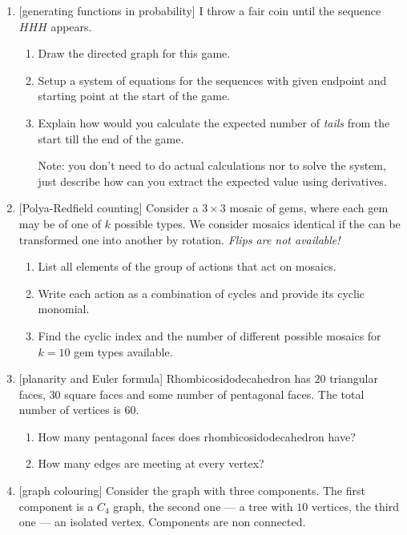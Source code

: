 \documentclass[12pt]{article}
\begin{document}
\begin{enumerate}
    
    \item {[generating functions in probability]} 
    I throw a fair coin until the sequence $HHH$ appears. %
\begin{enumerate}[label=\alph*)]
    \item Draw the directed graph for this game.
    \item Setup a system of equations for the sequences with given endpoint and starting point at the start of the game. 
    \item Explain how would you calculate the  expected number of \emph{tails} from the start till the end of the game.
    
    Note: you don't need to do actual calculations nor to solve the system, just describe how can you extract the expected value using derivatives. 
\end{enumerate}

    \item {[Polya-Redfield counting]}  Consider a $3\times 3$ mosaic of gems, where each gem may be of one of $k$ possible types.
    We consider mosaics identical if the can be transformed one into another by rotation. \emph{Flips are not available!} 
\begin{enumerate}[label=\alph*)]
    \item List all elements of the group of actions that act on mosaics.
    \item Write each action as a combination of cycles and provide its cyclic monomial. 
    \item Find the cyclic index and the number of different possible mosaics for $k=10$ gem types available.
\end{enumerate}
    \item {[planarity and Euler formula]} Rhombicosidodecahedron has $20$ triangular faces, $30$ square faces and some number of pentagonal faces. 
    The total number of vertices is $60$. 

    \begin{enumerate}[label=\alph*)]
        \item How many pentagonal faces does rhombicosidodecahedron have?
        \item How many edges are meeting at every vertex?
    \end{enumerate}

    \item {[graph colouring]} Consider the graph with three components. The first component is a $C_4$ graph, the second one — a tree with $10$ vertices,
    the third one — an isolated vertex. Components are non connected.
    

\end{enumerate}
\end{document}
